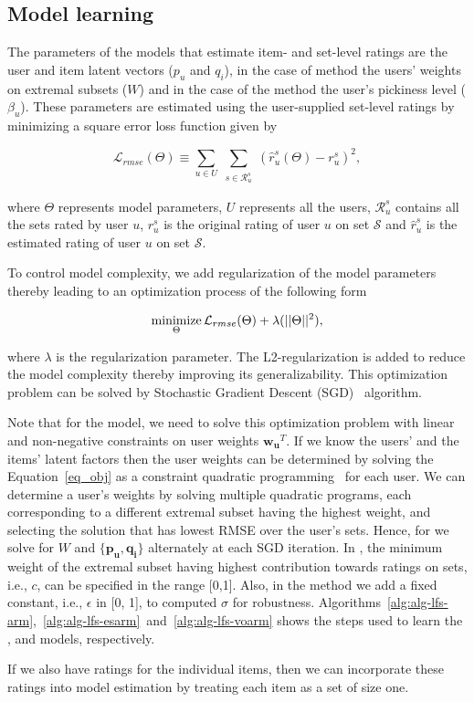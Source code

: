 \subsection{Model learning}\label{model_learn}
The parameters of the models that estimate item- and set-level ratings are the
user and item latent vectors ($p_u$ and $q_i$), in the case of \ES method
the users' weights on extremal subsets ($W$) and in the case of the \VO method
the user's pickiness level ($\beta_u$). These parameters are estimated using the
user-supplied set-level ratings by minimizing a square error loss function given
by


%
\begin{equation} \label{eq_rmse}
  \mathcal{L}_{rmse}(\Theta) \equiv \sum_{u \in U} \sum_{\substack{s \in
  \mathcal{R}_{u}^s}} (\hat{r}_{u}^s(\Theta) - r_{u}^s)^2,
\end{equation}
%


\noindent where $\Theta$ represents model parameters, $U$ represents all the users, $\mathcal{R}_{u}^s$ contains all the sets rated 
by user $u$, $r_{u}^s$ is the original rating of user $u$ on set $\mathcal{S}$ 
and $\hat{r}_{u}^s$ is the estimated rating of user $u$ on set $\mathcal{S}$.

To control model complexity, we add regularization of the model parameters
thereby leading to an optimization process of the following form

%
\begin{equation} \label{eq_obj}
  \minimize_{\Theta} \mathcal{L}_{rmse}(\Theta)  + \lambda (||\Theta||^2),
\end{equation}

%
\noindent where $\lambda$ is the regularization parameter. The L2-regularization is added to 
reduce the model complexity thereby improving its generalizability. 
This optimization problem can be solved by Stochastic Gradient Descent
(SGD)~\cite{r22} algorithm. 


Note that for the \ES model, we
need to solve this optimization problem with linear and non-negative constraints
on user weights $\bm{w_u}^T$. If we know the users' and the items' latent factors
then the user weights can be determined by solving the Equation~\ref{eq_obj} as
a constraint quadratic programming~\cite{boyd2004convex} for each user. 
We can determine a user's weights by solving multiple quadratic programs, each
corresponding to a different extremal subset having the highest weight, and
selecting the solution that has lowest RMSE over the user's sets.
Hence, for \ES we solve for $W$ and $\{\bm{p_u}, \bm{q_i}\}$ alternately at each SGD iteration. 
In \ES, the minimum weight of the extremal subset having highest contribution towards
ratings on sets, i.e., $c$, can be specified in the range [0,1].
Also, in the \VO method 
we add a fixed constant, i.e., $\epsilon$ in [0, 1], to computed $\sigma$ for robustness.
Algorithms~\ref{alg:alg-lfs-arm},~\ref{alg:alg-lfs-esarm}~and~\ref{alg:alg-lfs-voarm}
shows the steps used to learn the \ARM,
\ES and \VO models, respectively.

If we also have ratings for the individual items, then we can incorporate these
ratings into model estimation by treating each item as a set of size one. 

